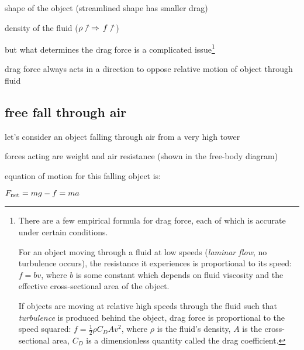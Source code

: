 \titem shape of the object (streamlined shape has smaller drag)

\titem density of the fluid ($\rho\nnearrow \, \Rightarrow \, f\nnearrow$)

but what determines the drag force is a complicated issue\footnote[][-2cm]{There are a few empirical formula for drag force, each of which is accurate under certain conditions.
	
	For an object moving through a fluid at low speeds (\emph{laminar flow}, no turbulence occurs), the resistance it experiences is proportional to its speed: $f=bv$, where $b$ is some constant which depends on fluid viscosity and the effective cross-sectional area of the object.
	
	If objects are moving at relative high speeds through the fluid such that \emph{turbulence} is produced behind the object, drag force is proportional to the speed squared: $ f = \frac{1}{2} \rho C_D A v^2$, where $\rho$ is the fluid's density, $A$ is the cross-sectional area, $C_D$ is a dimensionless quantity called the drag coefficient.}

\cmt drag force always acts in a direction to oppose relative motion of object through fluid




\subsection*{free fall through air}

\begin{marginfigure}
	\vspace*{-16pt}
	\centering
	\vspace*{-16pt}
\end{marginfigure}

let's consider an object falling through air from a very high tower

forces acting are weight and air resistance (shown in the free-body diagram)

equation of motion for this falling object is:

{
	\centering
	
	$ F_\text{net} = mg - f = ma $
	
}

